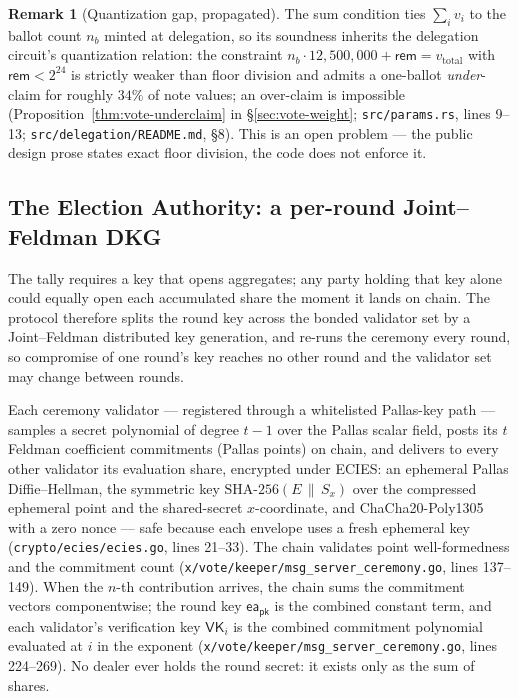\documentclass[11pt,a4paper]{article}
\theoremstyle{definition}
\newtheorem{remark}[theorem]{Remark}
\begin{document}
\begin{remark}[Quantization gap, propagated]\label{rem:vote-quant}
The sum condition ties $\sum_i v_i$ to the ballot count $n_b$ minted at
delegation, so its soundness inherits the delegation circuit's
quantization relation: the constraint
$n_b \cdot 12{,}500{,}000 + \mathsf{rem} = v_{\mathrm{total}}$ with
$\mathsf{rem} < 2^{24}$ is strictly weaker than floor division and admits a
one-ballot \emph{under}-claim for roughly $34\%$ of note values; an
over-claim is impossible (Proposition~\ref{thm:vote-underclaim} in
\S\ref{sec:vote-weight}; \texttt{src/params.rs}, lines 9--13;
\texttt{src/delegation/README.md}, \S 8). This is an open
problem --- the public design prose states exact floor division, the code
does not enforce it.
\end{remark}

\subsection{The Election Authority: a per-round Joint--Feldman DKG}
\label{sec:vote-dkg}

The tally requires a key that opens aggregates; any party holding that key
alone could equally open each accumulated share the moment it lands on
chain. The protocol therefore splits the round key across the bonded
validator set by a Joint--Feldman distributed key generation, and re-runs
the ceremony every round, so compromise of one round's key reaches no other
round and the validator set may change between rounds.

Each ceremony validator --- registered through a whitelisted Pallas-key
path --- samples a secret polynomial of degree $t - 1$ over the Pallas
scalar field, posts its $t$ Feldman coefficient commitments (Pallas points)
on chain, and delivers to every other validator its evaluation share,
encrypted under ECIES: an ephemeral Pallas Diffie--Hellman, the symmetric
key $\mathrm{SHA\text{-}256}(E \,\|\, S_x)$ over the compressed ephemeral
point and the shared-secret $x$-coordinate, and ChaCha20-Poly1305 with a
zero nonce --- safe because each envelope uses a fresh ephemeral key
(\texttt{crypto/ecies/ecies.go}, lines 21--33). The chain validates point
well-formedness and the commitment count
(\texttt{x/vote/keeper/msg\_server\_ceremony.go}, lines 137--149). When the
$n$-th contribution arrives, the chain sums the commitment vectors
componentwise; the round key $\mathsf{ea_{pk}}$ is the combined constant
term, and each validator's verification key $\mathsf{VK}_i$ is the combined
commitment polynomial evaluated at $i$ in the exponent
(\texttt{x/vote/keeper/msg\_server\_ceremony.go}, lines 224--269). No dealer
ever holds the round secret: it exists only as the sum of shares.
\end{document}
